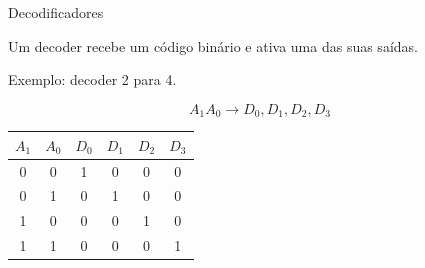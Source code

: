 \begin{frame}{Decodificadores}

    Um decoder recebe um código binário e ativa uma das suas saídas.

    Exemplo: decoder 2 para 4.

    \[
        A_1A_0
        \longrightarrow
        D_0,D_1,D_2,D_3
    \]

    \begin{center}
        \begin{tabular}{c c | c c c c}
            \hline
            $A_1$ & $A_0$ & $D_0$ & $D_1$ & $D_2$ & $D_3$ \\
            \hline
            0 & 0 & 1 & 0 & 0 & 0 \\
            0 & 1 & 0 & 1 & 0 & 0 \\
            1 & 0 & 0 & 0 & 1 & 0 \\
            1 & 1 & 0 & 0 & 0 & 1 \\
            \hline
        \end{tabular}
    \end{center}

\end{frame}